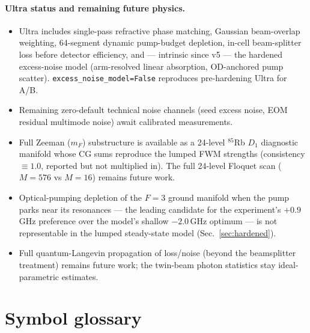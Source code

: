 \documentclass[11pt]{article}
\newcommand{\code}[1]{\texttt{#1}}
\begin{document}
\paragraph{Ultra status and remaining future physics.}
\begin{itemize}[leftmargin=1.6em]
  \item Ultra includes single-pass refractive phase matching, Gaussian
  beam-overlap weighting, 64-segment dynamic pump-budget depletion, in-cell
  beam-splitter loss before detector efficiency, and --- intrinsic since v5 ---
  the hardened excess-noise model (arm-resolved linear absorption, OD-anchored
  pump scatter). \code{excess\_noise\_model=False} reproduces pre-hardening
  Ultra for A/B.
  \item Remaining zero-default technical noise channels (seed excess noise, EOM
  residual multimode noise) await calibrated measurements.
  \item Full Zeeman ($m_F$) substructure is available as a 24-level $^{85}$Rb
  $D_1$ diagnostic manifold whose CG sums reproduce the lumped FWM strengths
  (consistency $\equiv1.0$, reported but not multiplied in). The full 24-level
  Floquet scan ($M=576$ vs $M=16$) remains future work.
  \item Optical-pumping depletion of the $F=3$ ground manifold when the pump
  parks near its resonances --- the leading candidate for the experiment's
  $+0.9\,$GHz preference over the model's shallow $-2.0\,$GHz optimum --- is not
  representable in the lumped steady-state model (Sec.~\ref{sec:hardened}).
  \item Full quantum-Langevin propagation of loss/noise (beyond the
  beamsplitter treatment) remains future work; the twin-beam photon statistics
  stay ideal-parametric estimates.
\end{itemize}

\appendix
\section{Symbol glossary}
\end{document}
